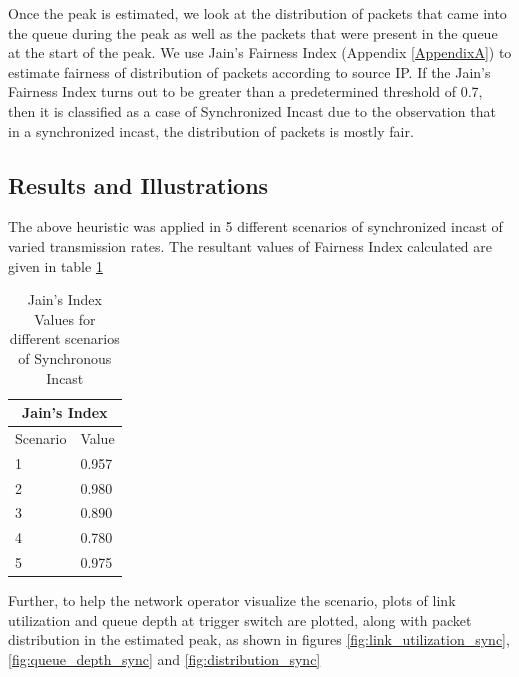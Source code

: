 Once the peak is estimated, we look at the distribution of packets that came into the queue during the peak
as well as the packets that were present in the queue at the start of the peak.
We use Jain's Fairness Index (Appendix \ref{AppendixA}) to estimate fairness of distribution of packets according to source IP.
If the Jain's Fairness Index turns out to be greater than a predetermined threshold of 0.7, then it is classified as a case of 
Synchronized Incast due to the observation that in a synchronized incast, the distribution of packets is mostly fair.
\subsection{Results and Illustrations}
The above heuristic was applied in 5 different scenarios of synchronized incast of varied transmission rates.
The resultant values of Fairness Index calculated are given in table \ref{tab:J_Index_Sync}
\begin{table}[h]
\begin{center}
\begin{tabular}{ |p{3cm}|p{3cm}|  }
	\hline
	\multicolumn{2}{|c|}{Jain's Index} \\
	\hline
	Scenario & Value \\
	\hline
	1 & 0.957 \\
	2 & 0.980 \\
	3 & 0.890 \\
	4 & 0.780 \\
	5 & 0.975 \\
	\hline
   \end{tabular}
\end{center}

\caption{Jain's Index Values for different scenarios of Synchronous Incast}
\label{tab:J_Index_Sync}
\end{table}

Further, to help the network operator visualize the scenario, plots of link utilization and queue depth at 
trigger switch are plotted, along with packet distribution in the estimated peak, as shown in figures \ref{fig:link_utilization_sync}, \ref{fig:queue_depth_sync}
and \ref{fig:distribution_sync}

